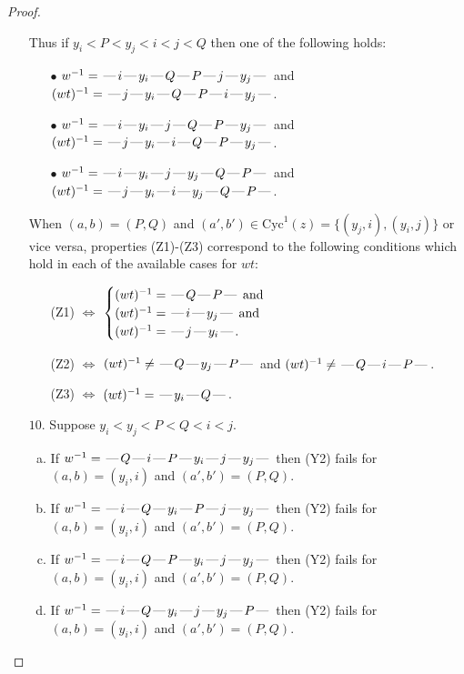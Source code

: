 \documentclass[10pt]{article}
\theoremstyle{definition}
\theoremstyle{definition}
\def\dash{\text{\hspace{0.5mm}---\hspace{0.5mm}}}
\def\Cyc{\mathrm{Cyc}}
\begin{document}
\begin{proof}
\begin{enumerate}
\begin{enumerate}[(a)]
\end{enumerate}
Thus if $y_i < P < y_j < i < j < Q$ then one of the following holds:
\begin{enumerate}
\item[$\bullet$] $w^{-1} = \dash i\dash y_i\dash Q\dash P\dash j\dash y_j\dash $ and $(wt)^{-1} = \dash j\dash y_i\dash Q\dash P\dash i\dash y_j\dash $.
\item[$\bullet$] $w^{-1} = \dash i\dash y_i\dash j\dash Q\dash P\dash y_j\dash $ and $(wt)^{-1} = \dash j\dash y_i\dash i\dash Q\dash P\dash y_j\dash $.
\item[$\bullet$] $w^{-1} = \dash i\dash y_i\dash j\dash y_j\dash Q\dash P\dash $ and $(wt)^{-1} = \dash j\dash y_i\dash i\dash y_j\dash Q\dash P\dash $.
\end{enumerate}
When $(a,b)= (P,Q)$ and $(a',b')\in \Cyc^1(z)=\{(y_j,i),(y_i,j)\}$ or vice versa,
properties (Z1)-(Z3) correspond to the following conditions which
hold in each of the available cases for $wt$:
\begin{enumerate}
\item[](Z1) $\Leftrightarrow$ $\begin{cases}\text{$(wt)^{-1} = \dash Q \dash P \dash$}\text{ and }\\
\text{$(wt)^{-1} = \dash i \dash y_j \dash$}\text{ and }\\
\text{$(wt)^{-1} = \dash j \dash y_i \dash$}.\end{cases}$
\item[](Z2) $\Leftrightarrow$ $(wt)^{-1} \neq \dash Q \dash y_j \dash P \dash$ and $(wt)^{-1}\neq \dash Q \dash i \dash P \dash$.
\item[](Z3) $\Leftrightarrow$ $(wt)^{-1} = \dash y_i \dash Q \dash$.
\end{enumerate}
\item[$10$.] Suppose $y_i < y_j < P < Q < i < j$.
\begin{enumerate}[(a)]
\item If $w^{-1} = \dash Q\dash i\dash P\dash y_i\dash j\dash y_j\dash $ then (Y2) fails for $(a,b)=(y_i,i)$ and $(a',b')=(P,Q)$.
\item If $w^{-1} = \dash i\dash Q\dash y_i\dash P\dash j\dash y_j\dash $ then (Y2) fails for $(a,b)=(y_i,i)$ and $(a',b')=(P,Q)$.
\item If $w^{-1} = \dash i\dash Q\dash P\dash y_i\dash j\dash y_j\dash $ then (Y2) fails for $(a,b)=(y_i,i)$ and $(a',b')=(P,Q)$.
\item If $w^{-1} = \dash i\dash Q\dash y_i\dash j\dash y_j\dash P\dash $ then (Y2) fails for $(a,b)=(y_i,i)$ and $(a',b')=(P,Q)$.

\end{enumerate}
\end{enumerate}
\end{proof}
\end{document}
